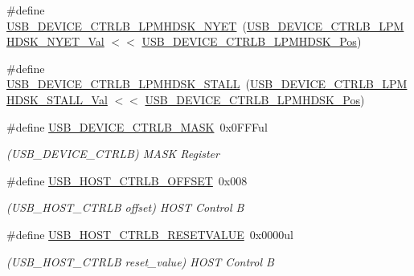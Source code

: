 \begin{DoxyCompactItemize}
\item 
\#define \mbox{\hyperlink{group___s_a_m_d21___u_s_b_ga184fbecd92429ec768805a0279460aa3}{U\+S\+B\+\_\+\+D\+E\+V\+I\+C\+E\+\_\+\+C\+T\+R\+L\+B\+\_\+\+L\+P\+M\+H\+D\+S\+K\+\_\+\+N\+Y\+ET}}~(\mbox{\hyperlink{group___s_a_m_d21___u_s_b_ga7f5bfd93b23484ad9c4619c32ebe8389}{U\+S\+B\+\_\+\+D\+E\+V\+I\+C\+E\+\_\+\+C\+T\+R\+L\+B\+\_\+\+L\+P\+M\+H\+D\+S\+K\+\_\+\+N\+Y\+E\+T\+\_\+\+Val}} $<$$<$ \mbox{\hyperlink{group___s_a_m_d21___u_s_b_ga7bbe2998f650533b2cc87bb63f7a28de}{U\+S\+B\+\_\+\+D\+E\+V\+I\+C\+E\+\_\+\+C\+T\+R\+L\+B\+\_\+\+L\+P\+M\+H\+D\+S\+K\+\_\+\+Pos}})
\item 
\#define \mbox{\hyperlink{group___s_a_m_d21___u_s_b_ga1800abe64ec717b65d4b17a21bd85345}{U\+S\+B\+\_\+\+D\+E\+V\+I\+C\+E\+\_\+\+C\+T\+R\+L\+B\+\_\+\+L\+P\+M\+H\+D\+S\+K\+\_\+\+S\+T\+A\+LL}}~(\mbox{\hyperlink{group___s_a_m_d21___u_s_b_ga249000ba2e98b6207cbb2176465bf154}{U\+S\+B\+\_\+\+D\+E\+V\+I\+C\+E\+\_\+\+C\+T\+R\+L\+B\+\_\+\+L\+P\+M\+H\+D\+S\+K\+\_\+\+S\+T\+A\+L\+L\+\_\+\+Val}} $<$$<$ \mbox{\hyperlink{group___s_a_m_d21___u_s_b_ga7bbe2998f650533b2cc87bb63f7a28de}{U\+S\+B\+\_\+\+D\+E\+V\+I\+C\+E\+\_\+\+C\+T\+R\+L\+B\+\_\+\+L\+P\+M\+H\+D\+S\+K\+\_\+\+Pos}})
\item 
\#define \mbox{\hyperlink{group___s_a_m_d21___u_s_b_gaf8a3a39289b6927db2d06bad0f135d42}{U\+S\+B\+\_\+\+D\+E\+V\+I\+C\+E\+\_\+\+C\+T\+R\+L\+B\+\_\+\+M\+A\+SK}}~0x0\+F\+F\+Ful
\begin{DoxyCompactList}\small\item\em (U\+S\+B\+\_\+\+D\+E\+V\+I\+C\+E\+\_\+\+C\+T\+R\+LB) M\+A\+SK Register \end{DoxyCompactList}\item 
\#define \mbox{\hyperlink{group___s_a_m_d21___u_s_b_gab7ae7f7cbb730982b59882020535f25a}{U\+S\+B\+\_\+\+H\+O\+S\+T\+\_\+\+C\+T\+R\+L\+B\+\_\+\+O\+F\+F\+S\+ET}}~0x008
\begin{DoxyCompactList}\small\item\em (U\+S\+B\+\_\+\+H\+O\+S\+T\+\_\+\+C\+T\+R\+LB offset) H\+O\+ST Control B \end{DoxyCompactList}\item 
\#define \mbox{\hyperlink{group___s_a_m_d21___u_s_b_ga9ca869733032951271ebefd0cdb41838}{U\+S\+B\+\_\+\+H\+O\+S\+T\+\_\+\+C\+T\+R\+L\+B\+\_\+\+R\+E\+S\+E\+T\+V\+A\+L\+UE}}~0x0000ul
\begin{DoxyCompactList}\small\item\em (U\+S\+B\+\_\+\+H\+O\+S\+T\+\_\+\+C\+T\+R\+LB reset\+\_\+value) H\+O\+ST Control B \end{DoxyCompactList}\item 

\end{DoxyCompactItemize}
